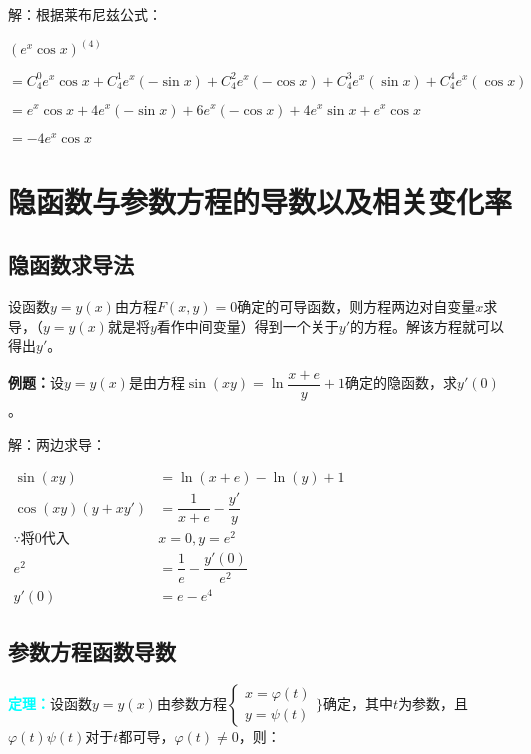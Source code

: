 \documentclass[UTF8, 12pt]{ctexart}
\begin{document}
        解：根据莱布尼兹公式：

        $(e^x\cos x)^{(4)}$

        $=C_4^0e^x\cos x+C_4^1e^x(-\sin x)+C_4^2e^x(-\cos x)+C_4^3e^x(\sin x)+C_4^4e^x(\cos x)$

        $=e^x\cos x+4e^x(-\sin x)+6e^x(-\cos x)+4e^x\sin x+e^x\cos x$

        $=-4e^x\cos x$

        \section{隐函数与参数方程的导数以及相关变化率}

        \subsection{隐函数求导法}

        设函数$y=y(x)$由方程$F(x,y)=0$确定的可导函数，则方程两边对自变量$x$求导，（$y=y(x)$就是将$y$看作中间变量）得到一个关于$y'$的方程。解该方程就可以得出$y'$。

        \textbf{例题：}设$y=y(x)$是由方程$\sin(xy)=\ln\dfrac{x+e}{y}+1$确定的隐函数，求$y'(0)$。

        解：两边求导：

        $
        \begin{aligned}
            \sin(xy) &=\ln(x+e)-\ln(y)+1 \\
            \cos(xy)(y+xy') &=\dfrac{1}{x+e}-\dfrac{y'}{y} \\
            \because\text{将0代入} & x=0, y=e^2 \\
            e^2&=\dfrac{1}{e}-\dfrac{y'(0)}{e^2} \\
            y'(0) & =e-e^4
        \end{aligned}
        $

        \subsection{参数方程函数导数}

        \textcolor{aqua}{\textbf{定理：}}设函数$y=y(x)$由参数方程$\left\{
        \begin{array}{l}
            x=\varphi(t) \\
            y=\psi(t)
        \end{array}
        \}\right.$确定，其中$t$为参数，且$\varphi(t)\psi(t)$对于$t$都可导，$\varphi(t)\neq 0$，则：
\end{document}
